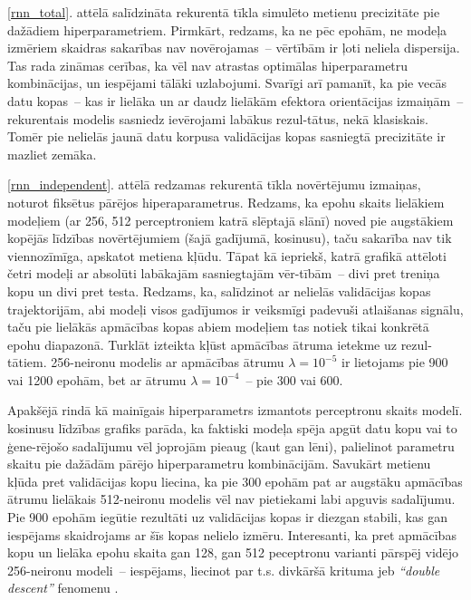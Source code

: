 \documentclass[12pt, a4paper]{article}
\numberwithin{equation}{section} %
\begin{document}
\ref{rnn_total}. attēlā salīdzināta rekurentā tīkla simulēto metienu precizitāte pie dažādiem hiperparametriem. Pirmkārt, redzams, ka ne pēc epohām, ne modeļa izmēriem skaidras sakarības nav novērojamas~-- vērtībām ir ļoti neliela dispersija. Tas rada zināmas cerības, ka vēl nav atrastas optimālas hiperparametru kombinācijas, un iespējami tālāki uzlabojumi. Svarīgi arī pamanīt, ka pie vecās datu kopas~-- kas ir lielāka un ar daudz lielākām efektora orientācijas izmaiņām~-- rekurentais modelis sasniedz ievērojami labākus rezul-tātus, nekā klasiskais. Tomēr pie nelielās jaunā datu korpusa validācijas kopas sasniegtā precizitāte ir mazliet zemāka.

\ref{rnn_independent}. attēlā redzamas rekurentā tīkla novērtējumu izmaiņas, noturot fiksētus pārējos hiperaparametrus. Redzams, ka epohu skaits lielākiem modeļiem (ar 256, 512 perceptroniem katrā slēptajā slānī) noved pie augstākiem kopējās līdzības novērtējumiem (šajā gadījumā, kosinusu), taču sakarība nav tik viennozīmīga, apskatot metiena kļūdu. Tāpat kā iepriekš, katrā grafikā attēloti četri modeļi ar absolūti labākajām sasniegtajām vēr-tībām~-- divi pret treniņa kopu un divi pret testa. Redzams, ka, salīdzinot ar nelielās validācijas kopas trajektorijām, abi modeļi visos gadījumos ir veiksmīgi padevuši atlaišanas signālu, taču pie lielākās apmācības kopas abiem modeļiem tas notiek tikai konkrētā epohu diapazonā. Turklāt izteikta kļūst apmācības ātruma ietekme uz rezul-tātiem. 256-neironu modelis ar apmācības ātrumu $\lambda = 10^{-5}$ ir lietojams pie 900 vai 1200 epohām, bet ar ātrumu $\lambda = 10^{-4}$~-- pie 300 vai 600. 


Apakšējā rindā kā mainīgais hiperparametrs izmantots perceptronu skaits modelī. kosinusu līdzības grafiks parāda, ka faktiski modeļa spēja apgūt datu kopu vai to ģene-rējošo sadalījumu vēl joprojām pieaug (kaut gan lēni), palielinot parametru skaitu pie dažādām pārējo hiperparametru kombinācijām. Savukārt metienu kļūda pret validācijas kopu liecina, ka pie 300 epohām pat ar augstāku apmācības ātrumu lielākais 512-neironu modelis vēl nav pietiekami labi apguvis sadalījumu. Pie 900 epohām iegūtie rezultāti uz validācijas kopas ir diezgan stabili, kas gan iespējams skaidrojams ar šīs kopas nelielo izmēru. Interesanti, ka pret apmācības kopu un lielāka epohu skaita gan 128, gan 512 peceptronu varianti pārspēj vidējo 256-neironu modeli~-- iespējams, liecinot par t.s. divkāršā krituma jeb \textit{``double descent''} fenomenu \cite{nakkiran2021deep}.


%
%
%
%
%
%
%
%
%
%
%
%
%
%
%
%
%
%
%
\end{document}
